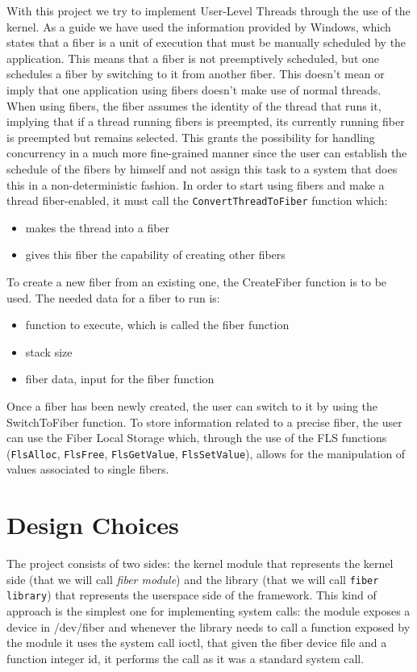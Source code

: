 \documentclass[a4paper,10pt]{article}
\begin{document}
With this project we try to implement User-Level Threads through the use of the kernel. As a guide we have used the information provided by Windows, which states that a fiber is a unit of execution that must be manually scheduled by the application. This means that a fiber is not preemptively scheduled, but one schedules a fiber by switching to it from another fiber. This doesn’t mean or imply that one application using fibers doesn’t make use of normal threads. When using fibers, the fiber assumes the identity of the thread that runs it, implying that if a thread running fibers is preempted, its currently running fiber is preempted but remains selected. This grants the possibility for handling concurrency in a much more fine-grained manner since the user can establish the schedule of the fibers by himself and not assign this task to a system that does this in a non-deterministic fashion.
In order to start using fibers and make a thread fiber-enabled, it must call the \lstinline{ConvertThreadToFiber} function which:
\begin{itemize}
	\item makes the thread into a fiber
	\item gives this fiber the capability of creating other fibers
\end{itemize}
To create a new fiber from an existing one, the CreateFiber function is to be used. The needed data for a fiber to run is:
\begin{itemize}
	\item function to execute, which is called the fiber function
	\item stack size
	\item fiber data, input for the fiber function
\end{itemize}

Once a fiber has been newly created, the user can switch to it by using the SwitchToFiber function.
To store information related to a precise fiber, the user can use the Fiber Local Storage which, through the use of the FLS functions (\lstinline{FlsAlloc}, \lstinline{FlsFree}, \lstinline{FlsGetValue}, \lstinline{FlsSetValue}), allows for the manipulation of values associated to single fibers.

\section{Design Choices}
The project consists of two sides: the kernel module that represents the kernel side (that we will call \textit{fiber module}) and the library (that we will call \texttt{fiber library}) that represents the userspace side of the framework. This kind of approach is the simplest one for implementing system calls: the module exposes a device in /dev/fiber and whenever the library needs to call a function exposed by the module it uses the system call ioctl, that given the fiber device file and a function integer id, it performs the call as it was a standard system call.
\end{document}
